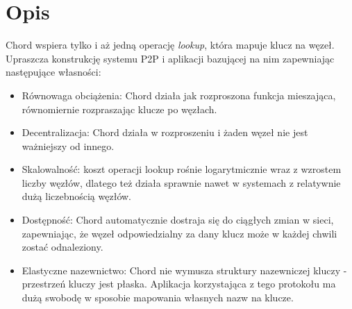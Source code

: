 \documentclass[12pt, twoside, openany]{report}
\begin{document}


\section{Opis}
Chord wspiera tylko i aż jedną operację \textit{lookup}, która mapuje klucz na węzeł. Upraszcza konstrukcję systemu P2P i aplikacji bazującej na nim zapewniając następujące własności:

\begin{itemize}
\item Równowaga obciążenia: Chord działa jak rozproszona funkcja mieszająca, równomiernie rozpraszając klucze po węzłach.

\item Decentralizacja: Chord działa w rozproszeniu i żaden węzeł nie jest ważniejszy od innego.

\item Skalowalność: koszt operacji lookup rośnie logarytmicznie wraz z wzrostem liczby węzłów, dlatego też działa sprawnie nawet w systemach z relatywnie dużą liczebnością węzłów.

\item Dostępność: Chord automatycznie dostraja się do ciągłych zmian w sieci, zapewniając, że węzeł odpowiedzialny za dany klucz może w każdej chwili zostać odnaleziony.

\item Elastyczne nazewnictwo: Chord nie wymusza struktury nazewniczej kluczy - przestrzeń kluczy jest płaska. Aplikacja korzystająca z tego protokołu ma dużą swobodę w sposobie mapowania własnych nazw na klucze.
\end{itemize}
\end{document}

